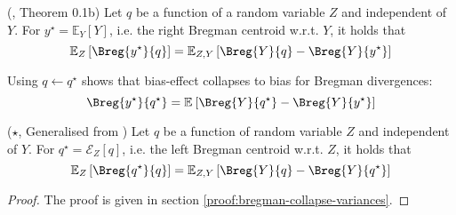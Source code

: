 \documentclass[../main.tex]{subfiles}
\begin{document}



\begin{lemma} \label{thm:bregman-collapse-bias} (\cite{pfau_GeneralizedBiasVarianceDecomposition_}, Theorem 0.1b)
    Let $q$ be a function of a random variable $Z$ and independent of $Y$. For $y^\star = \mathbb{E}_{Y}\left[ Y \right]$, i.e. the right Bregman centroid w.r.t. $Y$, it holds that
$$
\mathbb{E}_{Z}\left[ \Breg{y^\star}{q} \right]  = \mathbb{E}_{Z,Y}\left[ \Breg{Y}{q} - \Breg{Y}{y^\star} \right] 
$$
\end{lemma}

Using $q \gets q^\star$ shows that bias-effect collapses to bias for Bregman divergences: 
$$\Breg{y^\star}{q^\star} = \mathbb{E}_{}\left[ \Breg{Y}{q^\star} - \Breg{Y}{y^\star} \right]$$

\begin{lemma} \label{thm:bregman-collapse-variances} ($\star$, Generalised from \cite{wood_UnifiedTheoryDiversity_2023})
Let $q$ be a function of random variable $Z$ and independent of $Y$. For $q^\star = \mathcal{E}_{Z}\left[ q \right]$, i.e. the left Bregman centroid w.r.t. $Z$, it holds that
$$
\mathbb{E}_{Z}\left[ \Breg{q^\star}{q} \right] 
 = \mathbb{E}_{Z,Y}\left[ \Breg{Y}{q} - \Breg{Y}{q^\star} \right] 
$$
\end{lemma}
\begin{proof}
The proof is given in section \ref{proof:bregman-collapse-variances}.
\end{proof}
\end{document}

